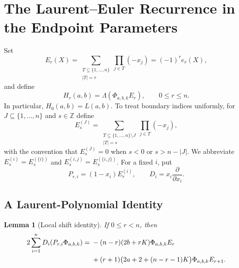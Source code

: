\documentclass[11pt,a4paper]{article}
\newtheorem{lemma}[theorem]{Lemma}
\theoremstyle{definition}
\begin{document}
\section{The Laurent--Euler Recurrence in the Endpoint Parameters}\label{sec:shift}

Set
\begin{equation}\label{eq:Er}
E_r(X)=\sum_{\substack{T\subseteq\{1,\ldots,n\}\\|T|=r}}
\prod_{j\in T}(-x_j)=(-1)^re_r(X),
\end{equation}
and define
\[
H_r(a,b)=\Lambda(\Phi_{a,b,k}E_r),\qquad 0\le r\le n.
\]
In particular, $H_0(a,b)=L(a,b)$.  To treat boundary indices
uniformly, for $J\subseteq\{1,\ldots,n\}$ and $s\in\mathbb Z$ define
\[
E_s^{(J)}=
\sum_{\substack{T\subseteq\{1,\ldots,n\}\setminus J\\|T|=s}}
\prod_{j\in T}(-x_j),
\]
with the convention that $E_s^{(J)}=0$ when $s<0$ or
$s>n-|J|$.  We abbreviate
$E_s^{(i)}=E_s^{(\{i\})}$ and
$E_s^{(i,j)}=E_s^{(\{i,j\})}$.  For a fixed $i$, put
\[
P_{r,i}=(1-x_i)E_r^{(i)},\qquad
D_i=x_i\frac{\partial}{\partial x_i}.
\]

\subsection{A Laurent-Polynomial Identity}

\begin{lemma}[Local shift identity]\label{lem:local-shift}
If $0\le r<n$, then
\begin{align}
2\sum_{i=1}^{n}D_i(P_{r,i}\Phi_{a,b,k})
={}&-(n-r)(2b+rK)\Phi_{a,b,k}E_r\notag\\
&+(r+1)\bigl(2a+2+(n-r-1)K\bigr)
\Phi_{a,b,k}E_{r+1}.
\label{eq:local-shift}
\end{align}
\end{lemma}
\end{document}
